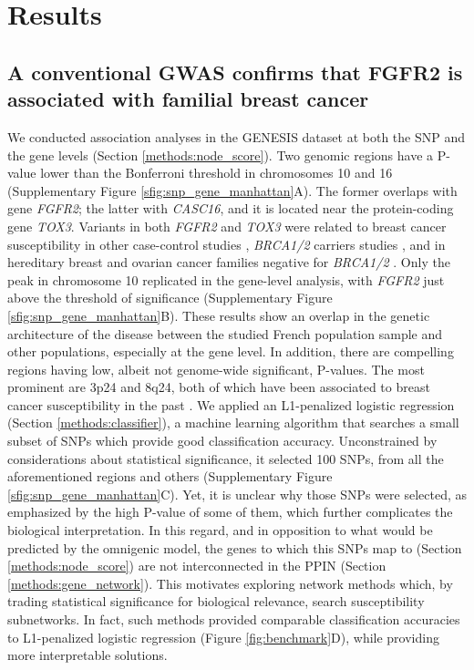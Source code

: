 \documentclass[twocolumn, 11pt, draft]{article}
\begin{document}
\section{Results}

\subsection{A conventional GWAS confirms that FGFR2 is associated with familial breast cancer}
\label{results:conventional}

We conducted association analyses in the GENESIS dataset at both the SNP and the gene levels (Section \ref{methods:node_score}). Two genomic regions have a P-value lower than the Bonferroni threshold in chromosomes 10 and 16 (Supplementary Figure \ref{sfig:snp_gene_manhattan}A). The former overlaps with gene \emph{FGFR2}; the latter with \emph{CASC16}, and it is located near the protein-coding gene \emph{TOX3}. Variants in both \emph{FGFR2} and \emph{TOX3} were related to breast cancer susceptibility in other case-control studies \cite{Michailidou2017}, \emph{BRCA1/2} carriers studies \cite{Mulligan2011}, and in hereditary breast and ovarian cancer families negative for \emph{BRCA1/2} \cite{rinella_genetic_2013}. Only the peak in chromosome 10 replicated in the gene-level analysis, with \emph{FGFR2} just above the threshold of significance (Supplementary Figure \ref{sfig:snp_gene_manhattan}B). These results show an overlap in the genetic architecture of the disease between the studied French population sample and other populations, especially at the gene level. In addition, there are compelling regions having low, albeit not genome-wide significant, P-values. The most prominent are 3p24 and 8q24, both of which have been associated to breast cancer susceptibility in the past \cite{brisbin_meta-analysis_2011,search_newly_2009}. We applied an L1-penalized logistic regression (Section \ref{methods:classifier}), a machine learning algorithm that searches a small subset of SNPs which provide good classification accuracy. Unconstrained by considerations about statistical significance, it selected 100 SNPs, from all the aforementioned regions and others (Supplementary Figure \ref{sfig:snp_gene_manhattan}C). Yet, it is unclear why those SNPs were selected, as emphasized by the high P-value of some of them, which further complicates the biological interpretation. In this regard, and in opposition to what would be predicted by the omnigenic model, the genes to which this SNPs map to (Section \ref{methods:node_score}) are not interconnected in the PPIN (Section \ref{methods:gene_network}). This motivates exploring network methods which, by trading statistical significance for biological relevance, search susceptibility subnetworks. In fact, such methods provided comparable classification accuracies to L1-penalized logistic regression (Figure \ref{fig:benchmark}D), while providing more interpretable solutions. 
\end{document}
